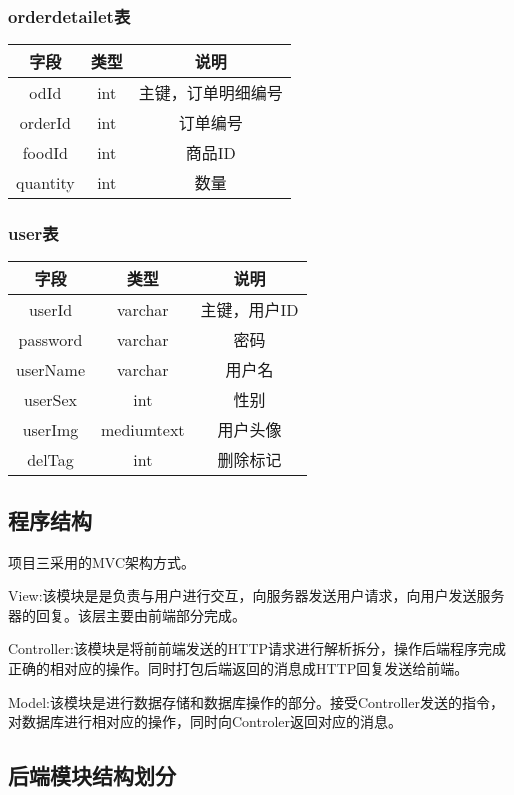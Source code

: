 \subsubsection{orderdetailet表}
\begin{tabular}{c|c|c}
    \hline
    字段       & 类型  & 说明        \\
    \hline
    odId     & int & 主键，订单明细编号 \\
    \hline
    orderId  & int & 订单编号      \\
    \hline
    foodId   & int & 商品ID      \\
    \hline
    quantity & int & 数量        \\
\end{tabular}


\subsubsection{user表}
\begin{tabular}{c|c|c}
    \hline
    字段       & 类型         & 说明      \\
    \hline
    userId   & varchar    & 主键，用户ID \\
    \hline
    password & varchar    & 密码      \\
    \hline
    userName & varchar    & 用户名     \\
    \hline
    userSex  & int        & 性别      \\
    \hline
    userImg  & mediumtext & 用户头像    \\
    \hline
    delTag   & int        & 删除标记    \\
\end{tabular}
\subsection{程序结构}
项目三采用的MVC架构方式。

View:该模块是是负责与用户进行交互，向服务器发送用户请求，向用户发送服务器的回复。该层主要由前端部分完成。

Controller:该模块是将前前端发送的HTTP请求进行解析拆分，操作后端程序完成正确的相对应的操作。同时打包后端返回的消息成HTTP回复发送给前端。

Model:该模块是进行数据存储和数据库操作的部分。接受Controller发送的指令，对数据库进行相对应的操作，同时向Controler返回对应的消息。

\subsection{后端模块结构划分}
